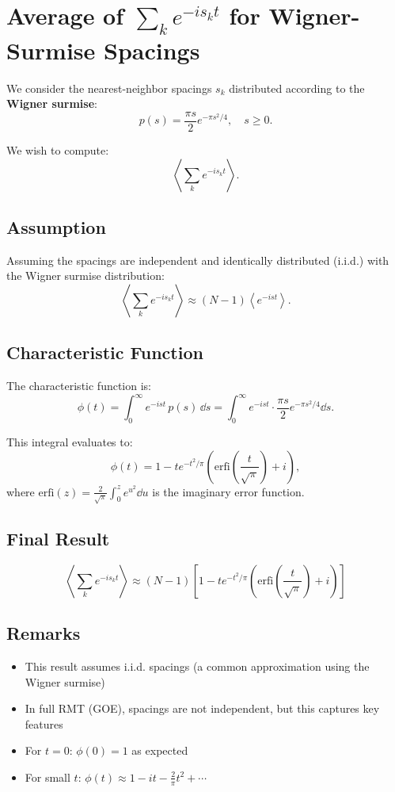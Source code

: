 \documentclass[10pt,a4paper]{article}
\begin{document}
\appendix
\section{Average of $\sum_k e^{-i s_k t}$ for Wigner-Surmise Spacings}

We consider the nearest-neighbor spacings $s_k$ distributed according to the \textbf{Wigner surmise}:
\[
p(s) = \frac{\pi s}{2} e^{-\pi s^2 / 4}, \quad s \geq 0.
\]

We wish to compute:
\[
\left\langle \sum_k e^{-i s_k t} \right\rangle.
\]

\subsection*{Assumption}
Assuming the spacings are independent and identically distributed (i.i.d.) with the Wigner surmise distribution:
\[
\left\langle \sum_k e^{-i s_k t} \right\rangle \approx (N-1) \left\langle e^{-i s t} \right\rangle.
\]

\subsection*{Characteristic Function}
The characteristic function is:
\[
\phi(t) = \int_0^\infty e^{-i s t} \, p(s) \, \dd s = \int_0^\infty e^{-i s t} \cdot \frac{\pi s}{2} e^{-\pi s^2 / 4} \dd s.
\]

This integral evaluates to:
\[
\phi(t) = 1 - t e^{-t^2/\pi} \left( \mathrm{erfi}\left( \frac{t}{\sqrt{\pi}} \right) + i \right),
\]
where $\mathrm{erfi}(z) = \frac{2}{\sqrt{\pi}} \int_0^z e^{u^2} \dd u$ is the imaginary error function.

\subsection*{Final Result}
\[
\boxed{\left\langle \sum_k e^{-i s_k t} \right\rangle \approx (N-1)\left[1 - t e^{-t^{2}/\pi}\left(\mathrm{erfi}\left(\frac{t}{\sqrt{\pi}}\right) + i\right)\right]}
\]

\subsection*{Remarks}
\begin{itemize}
    \item This result assumes i.i.d. spacings (a common approximation using the Wigner surmise)
    \item In full RMT (GOE), spacings are not independent, but this captures key features
    \item For $t = 0$: $\phi(0) = 1$ as expected
    \item For small $t$: $\phi(t) \approx 1 - i t - \frac{2}{\pi} t^2 + \cdots$
\end{itemize}
\end{document}
